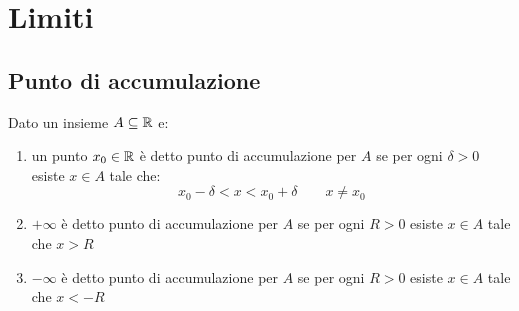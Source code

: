 
\chapter{Limiti} %

\label{ch:limiti} %


\section{Punto di accumulazione}
Dato un insieme $A \subseteq \mathbb{R}$ e:
\begin{enumerate}
\item un punto $x_0 \in \mathbb{R}$ è detto punto di accumulazione per $A$ se per ogni $\delta > 0$ esiste $x\in A$ tale che:
\[x_0-\delta <x<x_0+\delta \qquad x \neq x_0\]
\item $+\infty$ è detto punto di accumulazione per $A$ se per ogni $R>0$ esiste $x\in A$ tale che $x>R$
\item $-\infty$ è detto punto di accumulazione per $A$ se per ogni $R>0$ esiste $x\in A$ tale che $x<-R$
\end{enumerate}

